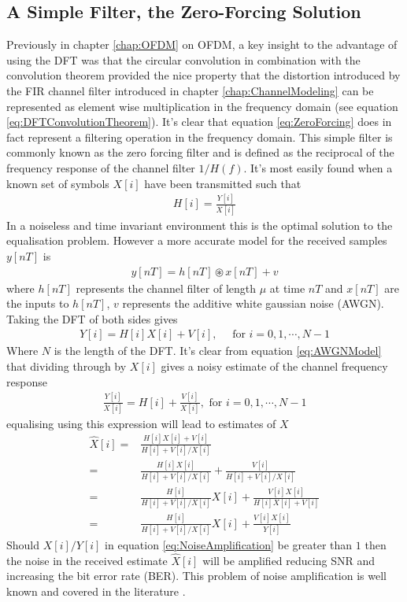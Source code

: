 \subsection{A Simple Filter, the Zero-Forcing Solution}
\label{subsec:ZeroForcing}
Previously in chapter \ref{chap:OFDM} on OFDM, a key insight to %
the advantage of using the DFT was that the circular convolution %
in combination with the convolution theorem provided the nice %
property that the distortion introduced by the FIR channel filter %
introduced in chapter \ref{chap:ChannelModeling} can be represented %
as element wise multiplication in the frequency domain (see equation %
\ref{eq:DFTConvolutionTheorem}). It's clear that equation %
\ref{eq:ZeroForcing} does in fact represent a filtering operation %
in the frequency domain. This simple filter is commonly known as %
the zero forcing filter and is defined as the reciprocal of the %
frequency response of the channel filter $1/H(f)$. %
It's most easily found when a known set of symbols $X[i]$ have %
been transmitted such that
\begin{align}
	H\left[i\right] = \frac{Y\left[i\right]}{X\left[i\right]}
\end{align}
In a noiseless and time invariant environment this is the optimal %
solution to the equalisation problem. However a more accurate %
model for the received samples $y[nT]$ is
\begin{align}
	y[nT]=h[nT]\circledast x[nT]%
	+ v
\end{align}
where $h[nT]$ represents the channel filter of length %
$\mu$ at time $nT$ and $x[nT]$ are the inputs to %
$h[nT]$, $v$ represents the additive white gaussian %
noise (AWGN). Taking the DFT of both sides gives %
\begin{align}
	Y[i] = H[i]X[i] + V[i]%
	,\quad \text{ for } i = 0,1,\cdots,N-1
	\label{eq:AWGNModel}
\end{align}
Where $N$ is the length of the DFT. It's clear from %
equation \ref{eq:AWGNModel} that dividing through %
by $X[i]$ gives a noisy estimate of the channel %
frequency response
\begin{align}
	\frac{Y[i]}{X[i]} = H[i] + \frac{V[i]}{X[i]}, %
	\text{ for } i = 0,1,\cdots,N-1
\end{align}
equalising using this expression will lead to estimates %
of $X$
\begin{align}
	\hat{X}[i] =& \frac{H[i]X[i]+V[i]}{H[i]+V[i]/X[i]} \\
	=& \frac{H[i]X[i]}{H[i]+V[i]/X[i]} + \frac{V[i]}{H[i]
	+ V[i]/X[i]} \\
	=& \frac{H[i]}{H[i]+V[i]/X[i]}X[i] + 
	\frac{V[i]X[i]}{H[i]X[i]+V[i]}\\
	=& \frac{H[i]}{H[i]+V[i]/X[i]}X[i] + 
	\frac{V[i]X[i]}{Y[i]}
	\label{eq:NoiseAmplification}
\end{align}
Should $X[i]/Y[i]$ in equation \ref{eq:NoiseAmplification} %
be greater than $1$ then the noise in the received estimate %
$\hat{X}[i]$ will be amplified reducing SNR and increasing the bit %
error rate (BER). This problem of noise amplification is well %
known and covered in the literature \cite{Mark03}. %

